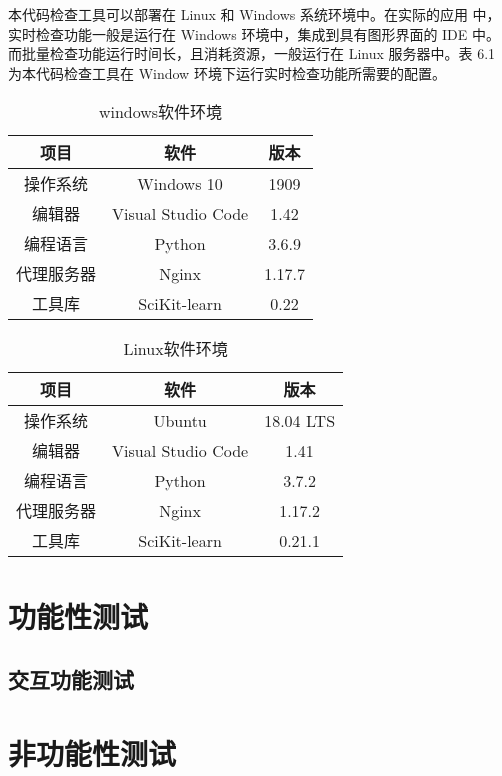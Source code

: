 本代码检查工具可以部署在 Linux 和 Windows 系统环境中。在实际的应用
中，实时检查功能一般是运行在 Windows 环境中，集成到具有图形界面的 IDE
中。而批量检查功能运行时间长，且消耗资源，一般运行在 Linux 服务器中。表
6.1 为本代码检查工具在 Window 环境下运行实时检查功能所需要的配置。

\begin{table}[h]
    \centering
    \caption{windows软件环境}
    \begin{tabular}{|*{3}{c|}}
        \hline
        项目 & 软件 & 版本 \\
        \hline
        操作系统 & Windows 10 & 1909 \\
        \hline
        编辑器 & Visual Studio Code & 1.42 \\
        编程语言 & Python & 3.6.9 \\
        \hline
        代理服务器 & Nginx & 1.17.7 \\
        \hline
        工具库 & SciKit-learn &  0.22 \\
        \hline 
    \end{tabular}
\end{table}

\begin{table}[h]
    \centering
    \caption{Linux软件环境}
    \begin{tabular}{|*{3}{c|}}
        \hline
        项目 & 软件 & 版本 \\
        \hline
        操作系统 & Ubuntu  & 18.04 LTS \\
        \hline
        编辑器 & Visual Studio Code & 1.41 \\
        编程语言 & Python & 3.7.2 \\
        \hline
        代理服务器 & Nginx & 1.17.2 \\
        \hline
        工具库 & SciKit-learn &  0.21.1 \\
        \hline 
    \end{tabular}
\end{table}

\section{功能性测试}

\subsection{交互功能测试}

\section{非功能性测试}

